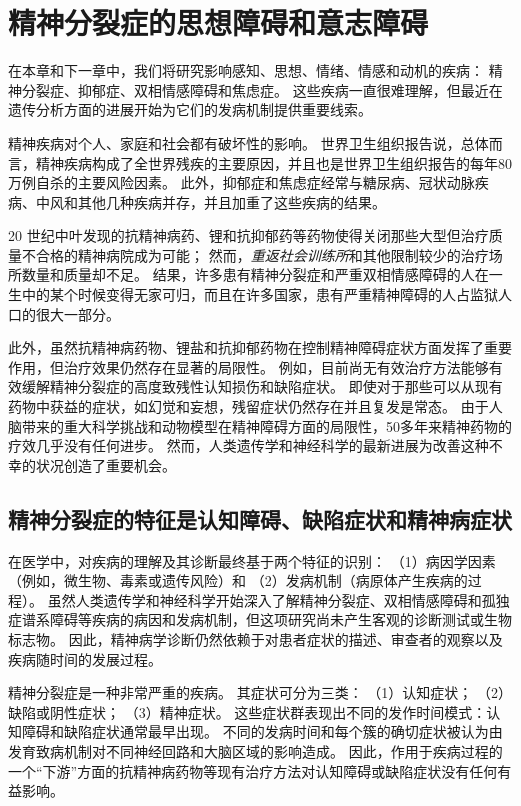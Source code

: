 \chapter{精神分裂症的思想障碍和意志障碍} \label{chap:chap60}

在本章和下一章中，我们将研究影响感知、思想、情绪、情感和动机的疾病：
精神分裂症、抑郁症、双相情感障碍和焦虑症。
这些疾病一直很难理解，但最近在遗传分析方面的进展开始为它们的发病机制提供重要线索。


精神疾病对个人、家庭和社会都有破坏性的影响。
世界卫生组织报告说，总体而言，精神疾病构成了全世界残疾的主要原因，并且也是世界卫生组织报告的每年80万例自杀的主要风险因素。
此外，抑郁症和焦虑症经常与糖尿病、冠状动脉疾病、中风和其他几种疾病并存，并且加重了这些疾病的结果。


20 世纪中叶发现的抗精神病药、锂和抗抑郁药等药物使得关闭那些大型但治疗质量不合格的精神病院成为可能；
然而，\textit{重返社会训练所}和其他限制较少的治疗场所数量和质量却不足。
结果，许多患有精神分裂症和严重双相情感障碍的人在一生中的某个时候变得无家可归，而且在许多国家，患有严重精神障碍的人占监狱人口的很大一部分。


此外，虽然抗精神病药物、锂盐和抗抑郁药物在控制精神障碍症状方面发挥了重要作用，但治疗效果仍然存在显著的局限性。
例如，目前尚无有效治疗方法能够有效缓解精神分裂症的高度致残性认知损伤和缺陷症状。
即使对于那些可以从现有药物中获益的症状，如幻觉和妄想，残留症状仍然存在并且复发是常态。
由于人脑带来的重大科学挑战和动物模型在精神障碍方面的局限性，50多年来精神药物的疗效几乎没有任何进步。
然而，人类遗传学和神经科学的最新进展为改善这种不幸的状况创造了重要机会。



\section{精神分裂症的特征是认知障碍、缺陷症状和精神病症状}

在医学中，对疾病的理解及其诊断最终基于两个特征的识别：
（1）病因学因素（例如，微生物、毒素或遗传风险）和 
（2）发病机制（病原体产生疾病的过程）。
虽然人类遗传学和神经科学开始深入了解精神分裂症、双相情感障碍和孤独症谱系障碍等疾病的病因和发病机制，但这项研究尚未产生客观的诊断测试或生物标志物。
因此，精神病学诊断仍然依赖于对患者症状的描述、审查者的观察以及疾病随时间的发展过程。


精神分裂症是一种非常严重的疾病。
其症状可分为三类：
（1）认知症状； 
（2）缺陷或阴性症状； 
（3）精神症状。
这些症状群表现出不同的发作时间模式：认知障碍和缺陷症状通常最早出现。
不同的发病时间和每个簇的确切症状被认为由发育致病机制对不同神经回路和大脑区域的影响造成。
因此，作用于疾病过程的一个“下游”方面的抗精神病药物等现有治疗方法对认知障碍或缺陷症状没有任何有益影响。



